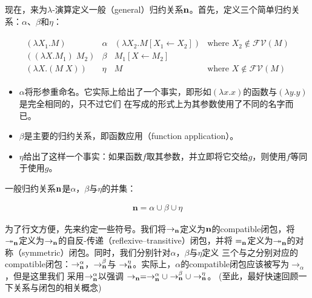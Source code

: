 \documentclass[12pt]{article}
\begin{document}
\indent{}现在，来为$\lambda$-演算定义一般（general）归约关系$\bf{n}$。首先，定义三个简单归约关系：$\alpha$、$\beta$和$\eta$：
\begin{tcolorbox}[top=-0.8em,left=0mm,right=0mm]
\begin{gather*}
\begin{array}{llll}
(\lambda X_1.M) & \alpha & (\lambda X_2.M[X_1 \leftarrow X_2]) & \textrm{where }X_2\not\in \mathcal{FV}(M)\\
((\lambda X.M_1)\; M_2) & \beta & M_1[X\leftarrow M_2] &\\
(\lambda X.(M\;X)) & \eta & M & \textrm{where }X\not\in \mathcal{FV}(M)
\end{array}
\end{gather*}
\end{tcolorbox}
\begin{itemize}
\item $\alpha$将形参重命名。它实际上给出了一个事实，即形如$(\lambda x.x)$的函数与$(\lambda y.y)$是完全相同的，只不过它们
      在写成的形式上为其参数使用了不同的名字而已。
\item $\beta$是主要的归约关系，即函数应用（function application）。
\item $\eta$给出了这样一个事实：如果函数$f$取其参数，并立即将它交给$g$，则使用$f$等同于使用$g$。
\end{itemize}
\noindent{}一般归约关系$\bf{n}$是$\alpha$，$\beta$与$\eta$的并集：
\begin{tcolorbox}[top=-1.6em,left=0mm,right=0mm,bottom=0mm]
\begin{gather*}
\mathbf{n} = \alpha \cup \beta \cup \eta
\end{gather*}
\end{tcolorbox}

\indent{}为了行文方便，先来约定一些符号。我们将$\rightarrow_{\bf{n}}$定义为$\bf{n}$的compatible闭包，将
$\twoheadrightarrow_{\bf{n}}$定义为$\rightarrow_{\bf{n}}$的自反-传递（reflexive–transitive）闭包，并将
$=_{\bf{n}}$定义为$\twoheadrightarrow_{\bf{n}}$的对称（symmetric）闭包。同时，我们分别针对$\alpha$，$\beta$与$\eta$定义
三个与之分别对应的compatible闭包：$\rightarrow_{\bf{n}}^{\alpha}$，$\rightarrow_{\bf{n}}^{\beta}$与
$\rightarrow_{\bf{n}}^{\eta}$。实际上，$\alpha$的compatible闭包应该被写为$\rightarrow_{\alpha}$，但是这里我们
采用$\rightarrow_{\bf{n}}^{\alpha}$以强调
$\rightarrow_{\bf{n}}=\rightarrow_{\bf{n}}^{\alpha}\cup\rightarrow_{\bf{n}}^{\beta}\cup\rightarrow_{\bf{n}}^{\eta}$。
(至此，最好快速回顾一下关系与闭包的相关概念)
\end{document}
